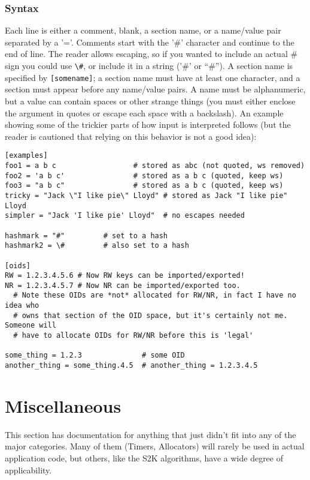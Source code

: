 \documentclass{article}
\begin{document}
\subsubsection{Syntax}

Each line is either a comment, blank, a section name, or a name/value pair
separated by a '='. Comments start with the '\#' character and continue to the
end of line. The reader allows escaping, so if you wanted to include an actual
\# sign you could use \verb|\#|, or include it in a string ('\#' or ``\#''). A
section name is specified by \verb|[somename]|; a section name must have at
least one character, and a section must appear before any name/value pairs. A
name must be alphanumeric, but a value can contain spaces or other strange
things (you must either enclose the argument in quotes or escape each space
with a backslash). An example showing some of the trickier parts of how input
is interpreted follows (but the reader is cautioned that relying on this
behavior is not a good idea):

\begin{verbatim}
[examples]
foo1 = a b c                  # stored as abc (not quoted, ws removed)
foo2 = 'a b c'                # stored as a b c (quoted, keep ws)
foo3 = "a b c"                # stored as a b c (quoted, keep ws)
tricky = "Jack \"I like pie\" Lloyd" # stored as Jack "I like pie" Lloyd
simpler = "Jack 'I like pie' Lloyd"  # no escapes needed

hashmark = "#"         # set to a hash
hashmark2 = \#         # also set to a hash

[oids]
RW = 1.2.3.4.5.6 # Now RW keys can be imported/exported!
NR = 1.2.3.4.5.7 # Now NR can be imported/exported too.
  # Note these OIDs are *not* allocated for RW/NR, in fact I have no idea who
  # owns that section of the OID space, but it's certainly not me. Someone will
  # have to allocate OIDs for RW/NR before this is 'legal'

some_thing = 1.2.3              # some OID
another_thing = some_thing.4.5  # another_thing = 1.2.3.4.5
\end{verbatim}

\pagebreak

\section{Miscellaneous}

This section has documentation for anything that just didn't fit into any of
the major categories. Many of them (Timers, Allocators) will rarely be used in
actual application code, but others, like the S2K algorithms, have a wide
degree of applicability.
\end{document}
